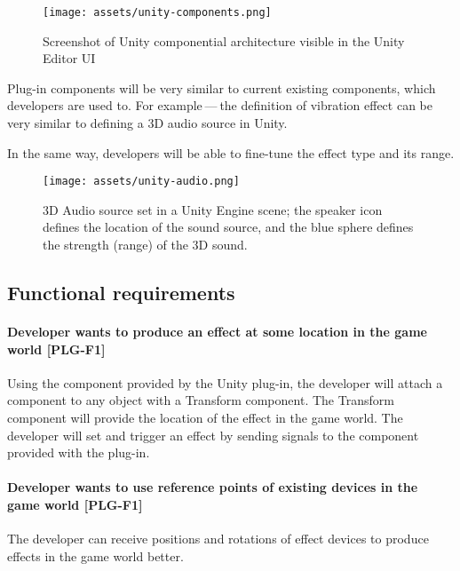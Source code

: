 \begin{figure}[h]{}
\centering\texttt{[image: assets/unity-components.png]}
\caption{Screenshot of Unity componential architecture visible in the Unity Editor UI}

\end{figure}

Plug-in components will be very similar to current existing components, which
developers are used to. For example — the definition of vibration effect can be
very similar to defining a 3D audio source in Unity.


In the same way, developers will be able to fine-tune the effect type and
its range.


\begin{figure}[h]{}
\centering\texttt{[image: assets/unity-audio.png]}
\caption{3D Audio source set in a Unity Engine scene; the speaker icon defines the location of the sound source, and the blue sphere defines the strength (range) of the 3D sound.}
\end{figure}

\hypertarget{x-functional-requirements}{\subsection{Functional requirements}}
\hypertarget{x-\textbf{developer-wants-to-produce-an-effect-at-some-location-in-the-game-world}-[plg-f1]}{\paragraph*{\textbf{Developer wants to produce an effect at some location in the game world} [PLG-F1]}}
Using the component provided by the Unity plug-in, the developer will attach
a component to any object with a Transform component. The Transform component
will provide the location of the effect in the game world. The developer will
set and trigger an effect by sending signals to the component provided with
the plug-in.


\hypertarget{x-\textbf{developer-wants-to-use-reference-points-of-existing-devices-in-the-game-world}-[plg-f1]}{\paragraph*{\textbf{Developer wants to use reference points of existing devices in the game world} [PLG-F1]}}
The developer can receive
positions and rotations of effect devices to produce effects in the
game world better.



